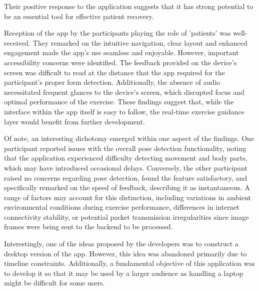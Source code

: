 \documentclass[12pt, titlepage]{article}
\begin{document}
Their positive response to the application suggests that it has strong potential to be an essential tool for effective patient
recovery.

Reception of the app by the participants playing the role of 'patients' was well-received. They remarked on the intuitive
navigation, clear layout and enhanced engagement made the app's use seamless and enjoyable. However, important accessibility
concerns were identified. The feedback provided on the device's screen was difficult to read at the distance that
the app required for the participant's proper form detection. Additionally, the absence of audio necessitated frequent glances to
the device's screen, which disrupted focus and optimal performance of the exercise. These findings suggest that, while the
interface within the app itself is easy to follow, the real-time exercise guidance layer would benefit from further
development. 

Of note, an interesting dichotomy emerged within one aspect of the findings. One participant reported issues with the 
overall pose detection functionality, noting that the application experienced difficulty detecting movement and body parts,
which may have introduced occasional delays. Conversely, the other participant raised no concerns regarding 
pose detection, found the feature satisfactory, and specifically remarked on the speed of feedback, describing 
it as instantaneous. A range of factors may account for this distinction, including variations in ambient environmental 
conditions during exercise performance, differences in internet connectivity stability, or potential packet 
transmission irregularities since image frames were being sent to the backend to be processed.

Interestingly, one of the ideas proposed by the developers was to construct a desktop version of the app. However, this idea
was abandoned primarily due to timeline constraints. Additionally, a fundamental objective of this application was 
to develop it so that it may be used by a larger audience as handling a laptop might be difficult for some users. 


\end{document}
